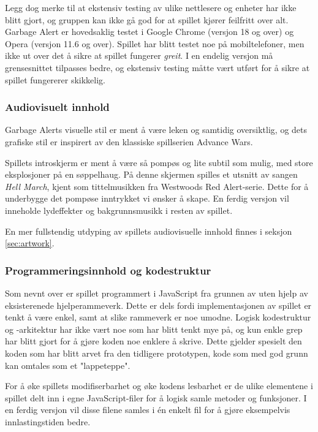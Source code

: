 Legg dog merke til at ekstensiv testing av ulike nettlesere og enheter har ikke blitt gjort, og gruppen kan ikke gå god for at spillet kjører feilfritt over alt. Garbage Alert er hovedsaklig testet i Google Chrome (versjon 18 og over) og Opera (versjon 11.6 og over). Spillet har blitt testet noe på mobiltelefoner, men ikke ut over det å sikre at spillet fungerer \emph{greit}. I en endelig versjon må grensesnittet tilpasses bedre, og ekstensiv testing måtte vært utført for å sikre at spillet fungererer skikkelig.


\subsubsection{Audiovisuelt innhold}
Garbage Alerts visuelle stil er ment å være leken og samtidig
oversiktlig, og dets grafiske stil er inspirert av den klassiske
spillserien Advance Wars.

Spillets introskjerm er ment å være så pompøs og lite subtil som mulig,
med store eksplosjoner på en søppelhaug. På denne skjermen spilles et
utsnitt av sangen \emph{Hell March}, kjent som tittelmusikken fra
Westwoods Red Alert-serie. Dette for å underbygge det pompøse inntrykket
vi ønsker å skape. En ferdig versjon vil inneholde lydeffekter og
bakgrunnsmusikk i resten av spillet.

En mer fullstendig utdyping av spillets audiovisuelle innhold finnes i
seksjon \ref{sec:artwork}.



\subsubsection{Programmeringsinnhold og kodestruktur}
Som nevnt over er spillet programmert i JavaScript fra grunnen av uten hjelp av eksisterenede hjelperammeverk. Dette er dels fordi implementasjonen av spillet er tenkt å være enkel, samt at slike rammeverk er noe umodne.
Logisk kodestruktur og -arkitektur har ikke vært noe som har blitt tenkt mye på, og kun enkle grep har blitt gjort for å gjøre koden noe enklere å skrive. Dette gjelder spesielt den koden som har blitt arvet fra den tidligere prototypen, kode som med god grunn kan omtales som et "lappeteppe".

For å øke spillets modifiserbarhet og øke kodens lesbarhet er de ulike elementene i spillet delt inn i egne JavaScript-filer for å logisk samle metoder og funksjoner. I en ferdig versjon vil disse filene samles i én enkelt fil for å gjøre eksempelvis innlastingstiden bedre.

